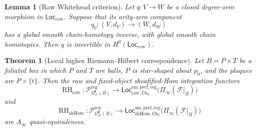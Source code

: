 \documentclass[10pt,a4paper]{amsart}
\newtheorem{thm}{Theorem}
\newtheorem{lem}{Lemma}
\newcommand{\CF}{{\mathcal F}}
\newcommand{\Ch}{\mathsf{Ch}}
\newcommand{\Loc}{\mathsf{Loc}}
\newcommand{\R}{{\mathbb{R}}}
\newcommand{\RH}{\operatorname{RH}}
\begin{document}
\begin{lem}[Raw Whitehead criterion]\label{lem:raw-whitehead}
Let $q:V\to W$ be a closed degree-zero morphism in
$\Loc_{\mathrm{raw}}$.  Suppose that its arity-zero component
\[
 q_0:(V,d_V)\longrightarrow(W,d_W)
\]
has a global smooth chain-homotopy inverse, with global smooth chain
homotopies.  Then $q$ is invertible in
$H^0(\Loc_{\mathrm{raw}})$.
\end{lem}

\begin{thm}[Local higher Riemann--Hilbert correspondence]
\label{thm:local-rh}
Let $B=P\times T$ be a foliated box in which $P$ and $T$ are balls,
$P$ is star-shaped about $p_0$, and the plaques are
$P\times\{t\}$.  Then the raw and fixed-object sheafified-Hom
integration functors
\[
 \RH_{\mathrm{raw}}:
 \mathcal P_{\Omega^\bullet_{\CF}(B)}^{\mathrm{reg}}
 \longrightarrow
 \Loc_{\mathrm{raw},\Ch_{\R}}^{\mathrm{sm,perf,reg}}
 \bigl(\Pi_\infty(\CF|_B)\bigr)
\]
and
\[
 \RH_{\mathrm{shHom}}:
 \mathcal P_{\Omega^\bullet_{\CF}(B)}^{\mathrm{reg}}
 \longrightarrow
 \Loc_{\mathrm{shHom},\Ch_{\R}}^{\mathrm{sm,perf,reg}}
 \bigl(\Pi_\infty(\CF|_B)\bigr)
\]
are $A_\infty$ quasi-equivalences.
\end{thm}
\end{document}
